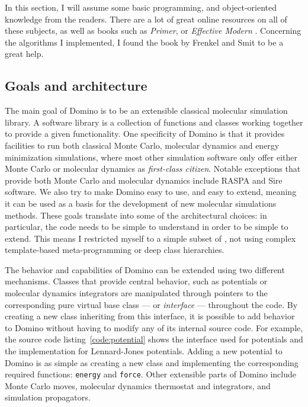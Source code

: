 \documentclass[thesis]{subfiles}
\begin{document}
In this section, I will assume some basic programming, \cxx and object-oriented
knowledge from the readers. There are a lot of great online resources on all of
these subjects, as well as books such as \emph{\cxx Primer}\cite{Lippman2012},
or \emph{Effective Modern \cxx}\cite{Meyers2014}. Concerning the algorithms I
implemented, I found the book by Frenkel and Smit\cite{Frenkel2002} to be a
great help.

\subsection{Goals and architecture}

The main goal of Domino is to be an extensible classical molecular simulation
library. A software library is a collection of functions and classes working
together to provide a given functionality. One specificity of Domino is that it
provides facilities to run both classical Monte Carlo, molecular dynamics and
energy minimization simulations, where most other simulation software only offer
either Monte Carlo or molecular dynamics as \emph{first-class citizen}. Notable
exceptions that provide both Monte Carlo and molecular dynamics include
RASPA\cite{Dubbeldam2015} and Sire\cite{SireMol} software. We also try to make
Domino easy to use, and easy to extend, meaning it can be used as a basis for
the development of new molecular simulations methods. These goals translate into
some of the architectural choices: in particular, the code needs to be simple to
understand in order to be simple to extend. This means I restricted myself to a
simple subset of \cxx, not using complex template-based meta-programming or deep
class hierarchies.

The behavior and capabilities of Domino can be extended using two different
mechanisms. Classes that provide central behavior, such as potentials or
molecular dynamics integrators are manipulated through pointers to the
corresponding pure virtual base class --- or \emph{interface} --- throughout the
code. By creating a new class inheriting from this interface, it is possible to
add behavior to Domino without having to modify any of its internal source code.
For example, the source code listing~\ref{code:potential} shows the interface
used for potentials and the implementation for Lennard-Jones potentials. Adding
a new potential to Domino is as simple as creating a new class and implementing
the corresponding required functions: \texttt{energy} and \texttt{force}. Other
extensible parts of Domino include Monte Carlo moves, molecular dynamics
thermostat and integrators, and simulation propagators.
\end{document}
